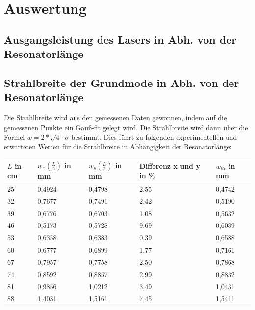 \documentclass[bigchapter,colorback,accentcolor=tud4b,linedtoc,11pt]{tudreport}
\numberwithin{equation}{subsection}
\begin{document}
\chapter{Auswertung}
\section{Ausgangsleistung des Lasers in Abh. von der Resonatorlänge}

\newpage
\section{Strahlbreite der Grundmode in Abh. von der Resonatorlänge}
Die Strahlbreite wird aus den gemessenen Daten gewonnen, indem auf die gemessenen Punkte ein Gauß-fit gelegt wird. Die Strahlbreite wird dann über die Formel
$w=2*\sqrt{4}\cdot\sigma$
bestimmt. Dies führt zu folgenden experimentellen und erwarteten Werten für die Strahlbreite in Abhängigkeit der Resonatorlänge:
\begin{center}
    \begin{tabular}{ | l | l | l | l | p{4cm} |}
    \hline
    $L$ in cm & $w_x\left(\frac{L}{2}\right)$ in mm & $w_y\left(\frac{L}{2}\right)$ in mm & Differenz x und y in \% & $w_{lit}$ in mm \\ \hline
    25 & 0,4924 & 0,4798 & 2,55 & 0,4742 \\ \hline
    32 & 0,7677 & 0,7491 & 2,42 & 0,5190 \\ \hline
    39 & 0,6776 & 0,6703 & 1,08 & 0,5632 \\ \hline
    46 & 0,5173 & 0,5728 & 9,69 & 0,6089 \\ \hline
    53 & 0,6358 & 0,6383 & 0,39 & 0,6588 \\ \hline
    60 & 0,6777 & 0,6899 & 1,77 & 0,7161 \\ \hline
    67 & 0,7957 & 0,7758 & 2,50 & 0,7868 \\ \hline
    74 & 0,8592 & 0,8857 & 2,99 & 0,8832 \\ \hline
    81 & 0,9856 & 1,0212 & 3,49 & 1,0431 \\ \hline
    88 & 1,4031 & 1,5161 & 7,45 & 1,5411 \\ \hline
    \end{tabular}
\end{center}
\end{document}
